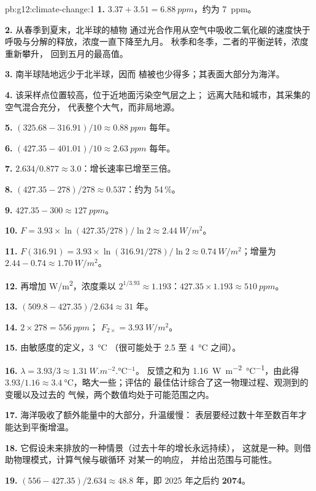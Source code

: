 \begin{solution}{pb:g12:climate-change:1}
\textbf{1.} $3.37 + 3.51 = \qty{6.88}{ppm}$，约为 \qty{7}{ppm}。

\textbf{2.} 从春季到夏末，北半球的植物
通过光合作用从空气中吸收二氧化碳的速度快于
呼吸与分解的释放，浓度一直下降至九月。
秋季和冬季，二者的平衡逆转，浓度重新攀升，
回到五月的最高值。

\textbf{3.} 南半球陆地远少于北半球，因而
植被也少得多；其表面大部分为海洋。

\textbf{4.} 该采样点位置较高，位于近地面污染空气层之上；
远离大陆和城市，其采集的空气混合充分，
代表整个大气，而非局地源。

\textbf{5.} $(325.68 - 316.91)/10 \approx \qty{0.88}{ppm}$ 每年。

\textbf{6.} $(427.35 - 401.01)/10 \approx \qty{2.63}{ppm}$ 每年。

\textbf{7.} $2.634/0.877 \approx 3.0$：增长速率已增至三倍。

\textbf{8.} $(427.35 - 278)/278 \approx 0.537$：约为 54\,\%。

\textbf{9.} $427.35 - 300 \approx \qty{127}{ppm}$。

\textbf{10.} $F = 3.93 \times \ln(427.35/278)/\ln 2 \approx
\qty{2.44}{W/m^2}$。

\textbf{11.} $F(316.91) = 3.93 \times \ln(316.91/278)/\ln 2 \approx
\qty{0.74}{W/m^2}$；增量为 $2.44 - 0.74 \approx \qty{1.70}{W/m^2}$。

\textbf{12.} 再增加 \unit{W/m^2}，浓度乘以
$2^{1/3.93} \approx 1.193$：$427.35 \times 1.193 \approx \qty{510}{ppm}$。

\textbf{13.} $(509.8 - 427.35)/2.634 \approx 31$ 年。

\textbf{14.} $2 \times 278 = \qty{556}{ppm}$； $F_{2\times} =
\qty{3.93}{W/m^2}$。

\textbf{15.} 由敏感度的定义，\qty{3}{\degreeCelsius}
（很可能处于 2.5 至 \qty{4}{\degreeCelsius} 之间）。

\textbf{16.} $\lambda = 3.93/3 \approx \qty{1.31}{W.m^{-2}.\degreeCelsius^{-1}}$。
反馈之和为 \qty{1.16}{W.m^{-2}.\degreeCelsius^{-1}}，由此得
$3.93/1.16 \approx \qty{3.4}{\degreeCelsius}$，略大一些；评估的
最佳估计综合了这一物理过程、观测到的变暖以及过去的
气候，两个数值均处于可能范围之内。

\textbf{17.} 海洋吸收了额外能量中的大部分，升温缓慢：
表层要经过数十年至数百年才能达到平衡增温。

\textbf{18.} 它假设未来排放的一种情景（过去十年的增长永远持续），
这就是一种。则借助物理模式，计算气候与碳循环
对某一的响应，
并给出范围与可能性。

\textbf{19.} $(556 - 427.35)/2.634 \approx 48.8$ 年，即 2025 年之后约
\textbf{2074}。
\end{solution}
